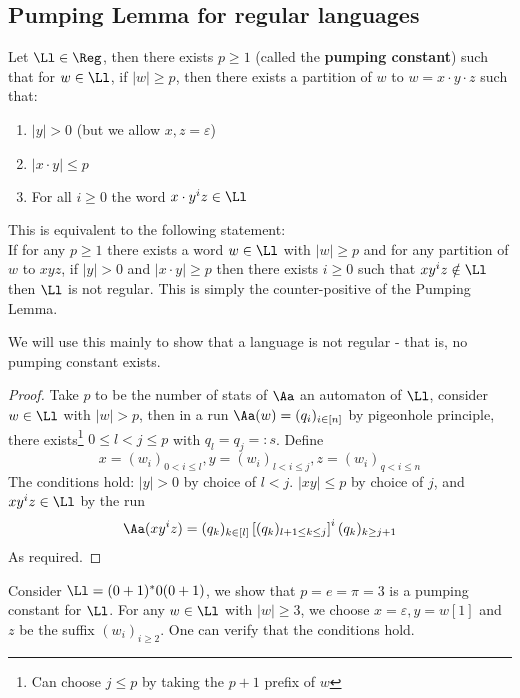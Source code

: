 \subsection{Pumping Lemma for regular languages}
\begin{blueBox}
	\begin{thm}
		Let $\Ll \in \Reg$, then there exists $p\geq 1$ (called the \textbf{pumping constant}) such that for $w\in \Ll$, if $|w| \geq p$, then there exists a partition of $w$ to $w=x\cdot y \cdot z$ such that:
		\begin{enumerate}
			\item $|y| >0$ (but we allow $x,z = \varepsilon$)
			\item $|x\cdot y| \leq p$ 
			\item For all $i\geq 0$ the word $x\cdot y^i z\in \Ll$
		\end{enumerate}
	\end{thm}
	\begin{remark}
		This is equivalent to the following statement: \\
		If for any $p\geq 1$ there exists a word $w\in \Ll$ with $|w|\geq p$ and for any partition of $w$ to $xyz$, if $|y| > 0$ and  $|x\cdot y| \geq p$ then there exists $i\geq 0$ such that $xy^iz\notin \Ll$ then $\Ll$ is not regular. This is simply the counter-positive of the Pumping Lemma.
	\end{remark}
\end{blueBox}
\begin{remark}
	We will use this mainly to show that a language is not regular - that is, no pumping constant exists.
\end{remark}
\begin{proof}
	Take $p$ to be the number of stats of $\Aa$ an automaton of $\Ll$, consider $w\in \Ll$ with $|w| >p$, then in a run $\Aa(w) = (q_i)_{i\in [n]}$ by pigeonhole principle, there exists\footnote{Can choose $j\leq p$ by taking the $p+1$ prefix of $w$} $0\leq l<j \leq p$ with $q_l = q_j =:s$. Define 
	\[x = (w_i)_{0 < i \leq l}, y = (w_i)_{l < i \leq j}, z = (w_i)_{q < i \leq n}
	\] The conditions hold: $|y| > 0$ by choice of $l<j$. $|xy|\leq p$ by choice of $j$, and $xy^iz\in \Ll$  by the run $$
	\Aa(xy^iz) = (q_k)_{k\in [l]}\left[(q_k)_{l+1\leq k \leq j}\right]^i (q_k)_{k\geq j+1}
	$$ 
	As required.
\end{proof}
\begin{example}
	Consider $\Ll = (0+1)^*0(0+1)$, we show that $p=e=\pi=3$ is a pumping constant for $\Ll$. For any $w\in \Ll$ with $|w|\geq 3$, we choose $x = \varepsilon, y = w[1]$ and $z$ be the suffix $(w_i)_{i\geq 2}$. One can verify that the conditions hold.
\end{example}
